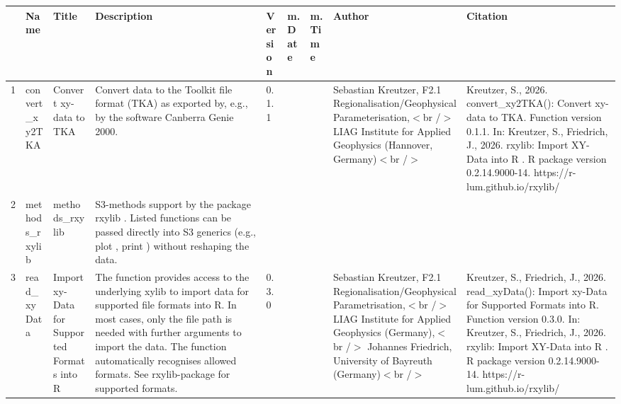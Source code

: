 \begin{table}[ht]
\centering
\begin{tabular}{rllllllll}
  \hline
 & Name & Title & Description & Version & m.Date & m.Time & Author & Citation \\ 
  \hline
1 & convert\_xy2TKA & Convert xy-data to TKA & Convert data to the Toolkit file format (TKA) as exported by, e.g., by the software Canberra Genie 2000. & 0.1.1
 &  &  & Sebastian Kreutzer, F2.1 Regionalisation/Geophysical Parameterisation,$<$br /$>$ LIAG Institute for Applied Geophysics (Hannover, Germany)$<$br /$>$ & Kreutzer, S., 2026. convert\_xy2TKA(): Convert xy-data to TKA. Function version 0.1.1. In: Kreutzer, S., Friedrich, J., 2026. rxylib: Import XY-Data into R . R package version 0.2.14.9000-14. https://r-lum.github.io/rxylib/
 \\ 
  2 & methods\_rxylib & methods\_rxylib & S3-methods support by the package  rxylib . Listed functions can be passed directly into S3 generics (e.g.,  plot ,  print ) without reshaping the data. &  &  &  &  &  \\ 
  3 & read\_xyData & Import xy-Data for Supported Formats into R & The function provides access to the underlying  xylib  to import data for supported file formats into R. In most cases, only the file path is needed with further arguments to import the data. The function automatically recognises allowed formats. See  rxylib-package  for supported formats. & 0.3.0
 &  &  & Sebastian Kreutzer, F2.1 Regionalisation/Geophysical Parametrisation,$<$br /$>$ LIAG Institute for Applied Geophysics (Germany),$<$br /$>$ Johannes Friedrich, University of Bayreuth (Germany)$<$br /$>$ & Kreutzer, S., Friedrich, J., 2026. read\_xyData(): Import xy-Data for Supported Formats into R. Function version 0.3.0. In: Kreutzer, S., Friedrich, J., 2026. rxylib: Import XY-Data into R . R package version 0.2.14.9000-14. https://r-lum.github.io/rxylib/
 \\ 
   \hline
\end{tabular}
\end{table}

